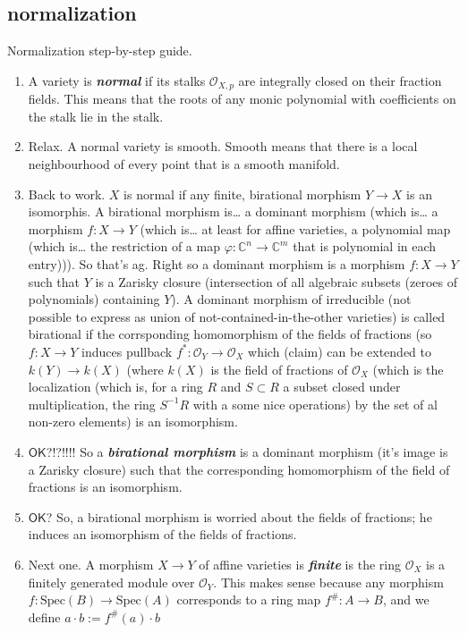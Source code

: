\subsection{normalization}

Normalization step-by-step guide.
\begin{enumerate}
\item A variety is \textit{\textbf{normal}} if its stalks  \(\mathcal{O}_{X,p}\) are integrally closed on their fraction fields. This means that the roots of any monic polynomial with coefficients on the stalk lie in the stalk.
\item Relax. A normal variety is smooth. Smooth means that there is a local neighbourhood of every point that is a smooth manifold.
\item Back to work. \(X\) is normal if any finite, birational morphism \(Y \to X\) is an isomorphis. A birational morphism is… a dominant morphism (which is… a morphism \(f:X \to Y\) (which is… at least for affine varieties, a polynomial map (which is… the restriction of a map \(\varphi:\mathbb{C}^n \to \mathbb{C}^m\) that is polynomial in each entry))). So that's ag. Right so a dominant morphism is a morphism \(f:X \to Y\) such that \(Y\) is a Zarisky closure (intersection of all algebraic subsets (zeroes of polynomials) containing \(Y\)). A dominant morphism of irreducible (not possible to express as union of not-contained-in-the-other varieties) is called birational if the corrsponding homomorphism of the fields of fractions (so \(f:X \to Y\) induces pullback \(f^*:\mathcal{O}_Y \to \mathcal{O}_X\) which (claim) can be extended to \(k(Y)\to k(X)\) (where \(k(X)\) is the field of fractions of \(\mathcal{O}_X\) (which is the localization (which is, for a ring \(R\) and \(S \subset R\) a subset closed under multiplication, the ring \(S^{-1}R\) with a some nice operations) by the set of al non-zero elements) is an isomorphism.
\item \(\mathsf{OK}\)?!?!!!! So a \textit{\textbf{birational morphism}} is a dominant morphism (it's image is a Zarisky closure) such that the corresponding homomorphism of the field of fractions is an isomorphism.
\item \(\mathsf{OK}\)? So, a birational morphism is worried about the fields of fractions; he induces an isomorphism of the fields of fractions.
\item Next one. A morphism \(X \to Y\) of affine varieties is \textit{\textbf{finite}} is the ring \(\mathcal{O}_X\) is a finitely generated module over \(\mathcal{O}_Y\). This makes sense because any morphism \( f: \mathrm{Spec}(B) \to \mathrm{Spec}(A) \) corresponds to a ring map \( f^\#: A \to B \), and we define \(a \cdot b := f^\#(a) \cdot b\)

\end{enumerate}
